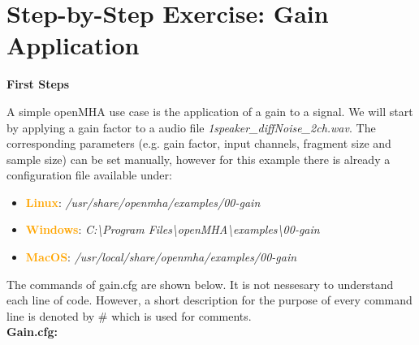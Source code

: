 \documentclass[11pt,a4paper,twoside]{article}
\newcommand{\+}{\discretionary{\mbox{\scriptsize$\hookleftarrow$}}{}{}}
\begin{document}
{{{

\section{Step-by-Step Exercise: Gain Application}

\textbf{First Steps}
\label{sec:first_steps}

A simple openMHA use case is the application of a gain to a signal. We will start by applying a gain factor to a audio file {{\ttfamily \textit{1speaker\_diffNoise\_2ch.wav}}}. The corresponding parameters (e.g. gain factor, input channels, fragment size and sample size) can be set manually, however for this example there is already a configuration file available under: 
\begin{itemize}
\item \textcolor{orange}{\textbf{Linux}}: \textit{/usr/share/openmha/examples/00-gain} 
\item \textcolor{orange}{\textbf{Windows}}: \textit{C:\textbackslash Program Files\textbackslash openMHA\textbackslash examples\textbackslash 00-gain}
\item \textcolor{orange}{\textbf{MacOS}}: \textit{/usr/local/share/openmha/examples/00-gain} 
\end{itemize}

The commands of gain.cfg are shown below. It is not nessesary to understand each line of code. However, a short description for the purpose of every command line is denoted by \# which is used for comments. \\

\textbf{Gain.cfg:}

}}}
\end{document}
